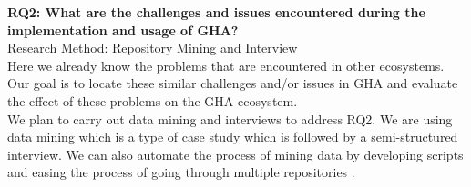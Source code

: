 \documentclass[conference]{IEEEtran}
\begin{document}
\textbf{RQ2: What are the challenges and issues encountered during the implementation and usage of GHA?}\\

Research Method: Repository Mining and Interview\\

	Here we already know the problems that are encountered in other ecosystems. Our goal is to locate these similar challenges and/or issues in GHA and evaluate the effect of these problems on the GHA ecosystem.\\

	We plan to carry out data mining and interviews to address RQ2. We are using data mining which is  a type of case study which is followed by a semi-structured interview. We can also automate the process of mining data by developing scripts and easing the process of going through multiple repositories \cite{b20}.\\
\end{document}
